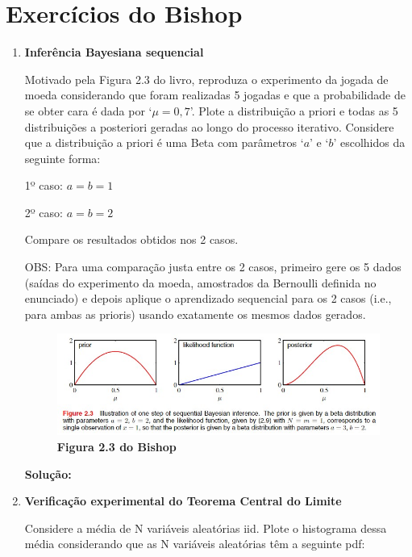 \section*{Exercícios do Bishop}

\begin{enumerate}[label=E\arabic*]


\item \textbf{Inferência Bayesiana sequencial} \par
Motivado pela Figura 2.3 do livro, reproduza o
experimento da jogada de moeda considerando que foram realizadas 5 jogadas e que a
probabilidade de se obter cara é dada por `$\mu = 0,7$'. Plote a distribuição a priori e todas
as 5 distribuições a posteriori geradas ao longo do processo iterativo. Considere que a
distribuição a priori é uma Beta com parâmetros `$a$' e `$b$' escolhidos da seguinte forma:

1º caso: $a = b = 1$

2º caso: $a = b = 2$

Compare os resultados obtidos nos 2 casos.

OBS: Para uma comparação justa entre os 2 casos, primeiro gere os 5 dados (saídas do
experimento da moeda, amostrados da Bernoulli definida no enunciado) e depois aplique
o aprendizado sequencial para os 2 casos (i.e., para ambas as prioris) usando
exatamente os mesmos dados gerados.
\begin{figure}[H]
    \caption*{\textbf{Figura 2.3 do Bishop}}
       \centering
       \includegraphics{bishop_23.jpg}
\end{figure}
\par
\textbf{Solução:}




\item \textbf{Verificação experimental do Teorema Central do Limite} \par
Considere a média de N variáveis aleatórias iid. Plote o histograma dessa média considerando que as N variáveis aleatórias têm a seguinte pdf:


\end{enumerate}
